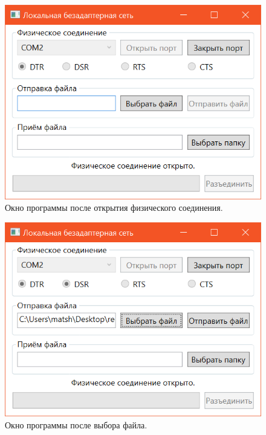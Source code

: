 \documentclass[a4paper,12pt]{article}
\begin{document}
\begin{figure}
\centering
\includegraphics{open.png}
\caption{Окно программы после открытия физического соединения.}\label{open}
\end{figure}
\begin{figure}
\centering
\includegraphics{send.png}
\caption{Окно программы после выбора файла.}\label{send}
\end{figure}
\end{document}
